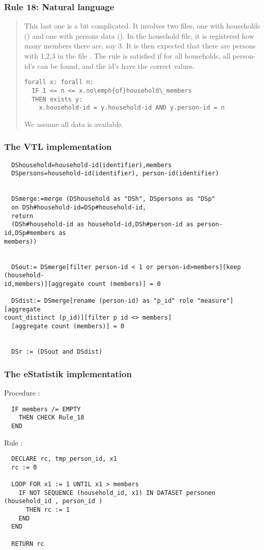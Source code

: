 \subsubsection*{  Rule 18: Natural language}
\begin{quote}


This last one is a bit complicated. It involves two files, one with households () and one with persons data (). In the household file, it is registered how many members there are, say 3. It is then expected that
there are persons with  1,2,3 in the file . The rule is satisfied if for all households, all person-id's can be found, and the id's have the correct values.


\begin{verbatim}
forall x: forall n:
  IF 1 <= n <= x.no\emph{of}household\_members
  THEN exists y: 
    x.household-id = y.household-id AND y.person-id = n
\end{verbatim}


We assume all data is available.

\end{quote}
\subsubsection*{The VTL implementation}
\begin{verbatim}
  DShousehold=household-id(identifier),members
  DSpersons=household-id(identifier), person-id(identifier)


  DSmerge:=merge (DShousehold as "DSh", DSpersons as "DSp"
  on DSh#household-id=DSp#household-id,
  return
  (DSh#household-id as household-id,DSh#person-id as person-id,DSp#members as
members))


  DSout:= DSmerge[filter person-id < 1 or person-id>members][keep (household-
id,members)][aggregate count (members)] = 0

  DSdist:= DSmerge[rename (person-id) as "p_id" role "measure"][aggregate
count_distinct (p_id)][filter p id <> members]
  [aggregate count (members)] = 0


  DSr := (DSout and DSdist)

\end{verbatim}

\subsubsection*{The eStatistik implementation}
\noindent
Procedure :
\begin{verbatim}
  IF members /= EMPTY
    THEN CHECK Rule_18
  END
\end{verbatim}
\noindent
Rule :
\begin{verbatim}
  DECLARE rc, tmp_person_id, x1
  rc := 0

  LOOP FOR x1 := 1 UNTIL x1 > members
    IF NOT SEQUENCE (household_id, x1) IN DATASET personen (household_id , person_id )
      THEN rc := 1
    END
  END

  RETURN rc
\end{verbatim}

